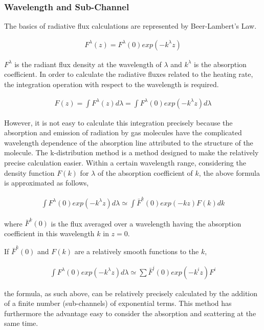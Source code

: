 \hypertarget{wavelength-and-sub-channel}{%
\subsubsection{Wavelength and
Sub-Channel}\label{wavelength-and-sub-channel}}

The basics of radiative flux calculations are represented by
Beer-Lambert's Law.

\begin{eqnarray}
  F^\lambda(z) = F^\lambda(0) exp (-k^\lambda z)
\end{eqnarray}

\(F^{\lambda}\) is the radiant flux density at the wavelength of
\(\lambda\) and \(k^{\lambda}\) is the absorption coefficient. In order
to calculate the radiative fluxes related to the heating rate, the
integration operation with respect to the wavelength is required.

\begin{eqnarray}
  F(z) = \int F^\lambda(z) d \lambda= \int F^\lambda(0) exp (-k^\lambda z) d \lambda
\end{eqnarray}

However, it is not easy to calculate this integration precisely because
the absorption and emission of radiation by gas molecules have the
complicated wavelength dependence of the absorption line attributed to
the structure of the molecule. The k-distribution method is a method
designed to make the relatively precise calculation easier. Within a
certain wavelength range, considering the density function \(F(k)\) for
\(\lambda\) of the absorption coefficient of \(k\), the above formula is
approximated as follows,

\begin{eqnarray}
 \int F^\lambda(0) exp (-k^\lambda z) d \lambda
 \simeq \int \bar{F}^k(0) exp (-k z) F(k) dk
\end{eqnarray}

where \(\bar{F}^k(0)\) is the flux averaged over a wavelength having the
absorption coefficient in this wavelength \(k\) in \(z=0\).

If \(\bar{F}^k(0)\) and \(F(k)\) are a relatively smooth functions to
the \(k\),

\begin{eqnarray}
 \int F^\lambda(0) exp (-k^\lambda z) d \lambda
 \simeq \sum \bar{F}^i(0) exp (-k^i z) F^i
\end{eqnarray}

the formula, as such above, can be relatively precisely calculated by
the addition of a finite number (sub-channels) of exponential terms.
This method has furthermore the advantage easy to consider the
absorption and scattering at the same time.

